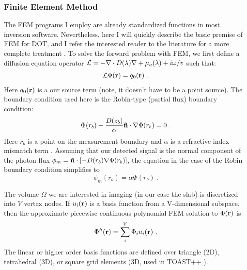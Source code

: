 \subsubsection{Finite Element Method}
\label{sec:FEM}
The FEM programs I employ are already standardized functions in most inversion software. Nevertheless, here I will quickly describe the basic premise of FEM for DOT, and I refer the interested reader to the literature for a more complete treatment \cite{Arridge1993,Paulsen1995}. To solve the forward problem with FEM, we first define a diffusion equation operator $\mathcal{L} =-\nabla \cdot D(\lambda)\nabla+\mu_a(\lambda)+i\omega/v$ such that: 
\begin{equation}
\label{eqn:DE_FEM}
\mathcal{L}\Phi(\mathbf{r})=q_0(\mathbf{r}) \ .
\end{equation}
Here $q_0(\mathbf{r})$ is a our source term (note, it doesn't have to be a point source). The boundary condition used here is the Robin-type (partial flux) boundary condition: 
%
\begin{equation}
\Phi(r_b)+ \frac{D(z_b)}{\alpha}\mathbf{\hat{n}}\cdot\nabla\Phi(r_b)=0 \ .
\end{equation}
Here $r_b$ is a point on the measurement boundary and $\alpha$ is a refractive index mismatch term \cite{Arridge2000}. Assuming that our detected signal is the normal component of the photon flux $\phi_m = \mathbf{\hat{n}}\cdot[-D(r_b)\nabla\Phi(r_b)]$, the equation in the case of the Robin boundary condition simplifies to
\begin{equation}
\phi_m(r_b)=\alpha\Phi(r_b) \ .
\end{equation}

The volume $\Omega$ we are interested in imaging (in our case the slab) is discretized into $V$ vertex nodes. If $ u_i(\mathbf{r})$ is a basis function from a V-dimensional subspace, then the approximate piecewise continuous polynomial FEM solution to $\Phi(\mathbf{r})$ is 
\begin{align}
\Phi^h(\mathbf{r})= \sum_i^V \Phi_i u_i(\mathbf{r}) \ .
\end{align}
\noindent
The linear or higher order basis functions are defined over triangle (2D), tetrahedral (3D), or square grid elements (3D, used in TOAST++ \cite{Schweiger2014}).

